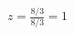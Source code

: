 \documentclass[preview]{standalone}
\begin{document}
\begin{align*}
z = \frac{8/3}{8/3} = 1
\end{align*}
\end{document}
